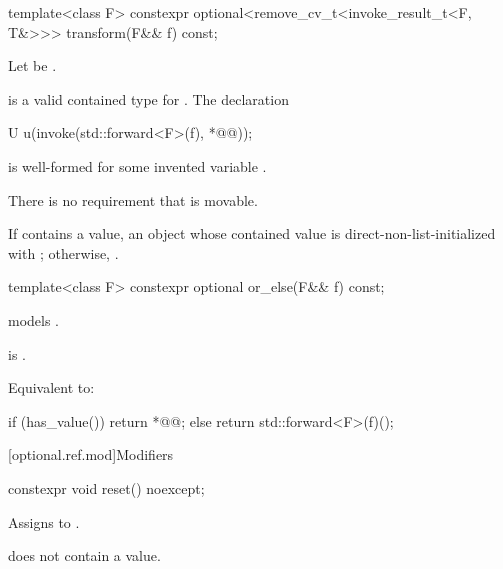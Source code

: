 \begin{itemdecl}
template<class F>
  constexpr optional<remove_cv_t<invoke_result_t<F, T&>>> transform(F&& f) const;
\end{itemdecl}

\begin{itemdescr}
\pnum
  Let  be .

\pnum
\mandates
{} is a valid contained type for .
The declaration
\begin{codeblock}
U u(invoke(std::forward<F>(f), *@@));
\end{codeblock}
is well-formed for some invented variable .
\begin{note}
There is no requirement that  is movable.
\end{note}

\pnum
\returns
If  contains a value, an  object
whose contained value is direct-non-list-initialized with
;
otherwise, .
\end{itemdescr}

\begin{itemdecl}
template<class F> constexpr optional or_else(F&& f) const;
\end{itemdecl}

\begin{itemdescr}
\pnum
\constraints
{} models .

\pnum
\mandates
{} is .

\pnum
\effects
Equivalent to:
\begin{codeblock}
if (has_value()) {
  return *@@;
} else {
  return std::forward<F>(f)();
}
\end{codeblock}
\end{itemdescr}

[optional.ref.mod]{Modifiers}

\begin{itemdecl}
constexpr void reset() noexcept;
\end{itemdecl}

\begin{itemdescr}
\pnum
\effects
Assigns  to .

\pnum
\ensures
{} does not contain a value.
\end{itemdescr}

